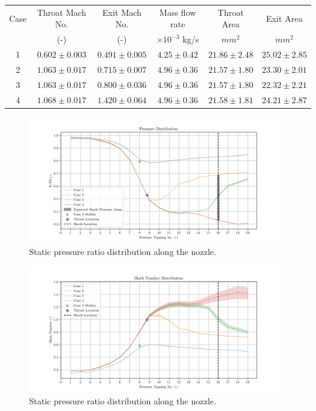 \documentclass{article}
\begin{document}
\begin{center}
    \begin{tabular}{|c|c|c|c|c|c|}
    \hline 
    Case & Throat Mach No.  & Exit Mach No. & Mass flow rate & Throat Area & Exit Area\\
     & (-) & (-) & $\times 10^{-3}$ kg/s & $mm^2$ & $mm^2$ \\
    \hline 
    1 & $0.602\pm 0.003$ & $0.491\pm 0.005$ & $ 4.25\pm 0.42  $ & $21.86 \pm 2.48 $ & $25.02 \pm 2.85 $ \\
    2 & $1.063\pm 0.017$ & $0.715\pm 0.007$ & $ 4.96\pm 0.36  $ & $21.57 \pm 1.80 $ & $23.30 \pm 2.01 $ \\
    3 & $1.063\pm 0.017$ & $0.800\pm 0.036$ & $ 4.96\pm 0.36 $ & $21.57 \pm 1.80 $ & $22.32 \pm 2.21 $ \\
    4 & $1.068\pm 0.017$ & $1.420\pm 0.064$ & $ 4.96\pm 0.36 $ & $21.58 \pm 1.81 $ & $24.21 \pm 2.87 $ \\
    \hline
    \end{tabular}
    \label{tab:1}
\end{center}
 
\begin{figure}[H]
    \centering
    \includegraphics[width=0.98\textwidth]{../Supersonic_Nozzle/pressure_ratio_distribution_corrected.png}
    \caption{Static pressure ratio distribution along the nozzle.}
    \label{fig:pressure_distribution}
\end{figure}

\begin{figure}[H]
    \centering
    \includegraphics[width=0.98\textwidth]{../Supersonic_Nozzle/mach_number_distribution_corrected.png}
    \caption{Static pressure ratio distribution along the nozzle.}
    \label{fig:mach_distribution}
\end{figure}
\end{document}
